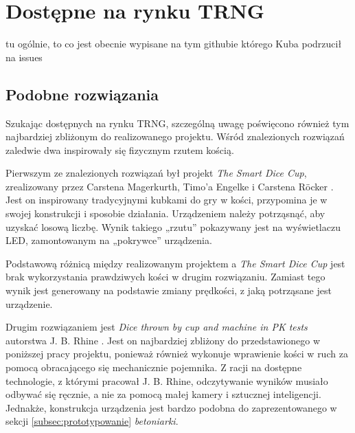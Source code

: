 \section{Dostępne na rynku TRNG}\label{sec:dostepne-na-rynku-trng}

tu ogólnie, to co jest obecnie wypisane na tym githubie którego Kuba podrzucił na issues

\subsection{Podobne rozwiązania}

Szukając dostępnych na rynku TRNG, szczególną uwagę poświęcono również tym najbardziej zbliżonym do realizowanego projektu.
Wśród znalezionych rozwiązań zaledwie dwa inspirowały się fizycznym rzutem kością. 

Pierwszym ze znalezionych rozwiązań był projekt \textit{The Smart Dice Cup}, zrealizowany przez Carstena Magerkurth, 
Timo'a Engelke i Carstena Röcker \cite{SmartDice}. Jest on inspirowany tradycyjnymi kubkami do gry w kości, przypomina
je w swojej konstrukcji i sposobie działania. Urządzeniem należy potrząsnąć, aby uzyskać losową 
liczbę. Wynik takiego „rzutu” pokazywany jest na wyświetlaczu LED, zamontowanym na „pokrywce” urządzenia.

Podstawową różnicą między realizowanym projektem a \textit{The Smart Dice Cup} jest brak wykorzystania prawdziwych 
kości w drugim rozwiązaniu. Zamiast tego wynik jest generowany na podstawie zmiany prędkości, z jaką potrząsane jest 
urządzenie.

Drugim rozwiązaniem jest \textit{Dice thrown by cup and machine in PK tests} autorstwa J. B. Rhine \cite{betoniarka43}. 
Jest on najbardziej zbliżony do przedstawionego w poniższej pracy projektu, ponieważ również wykonuje wprawienie kości w 
ruch za pomocą obracającego się mechanicznie pojemnika. Z racji na dostępne technologie, z którymi pracował J. B. Rhine,
odczytywanie wyników musiało odbywać się ręcznie, a nie za pomocą małej kamery i sztucznej inteligencji. Jednakże,
konstrukcja urządzenia jest bardzo podobna do zaprezentowanego w sekcji \ref{subsec:prototypowanie} \textit{betoniarki}.